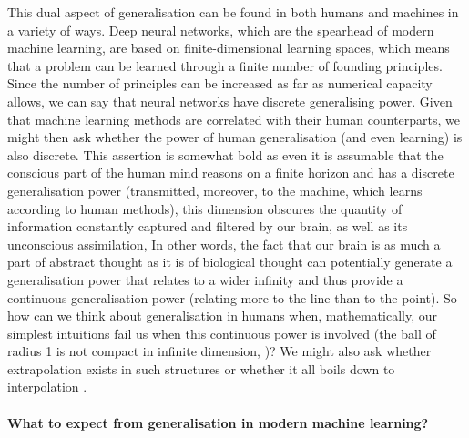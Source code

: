 This dual aspect of generalisation can be found in both humans and machines in a variety of ways. Deep neural networks, which are the spearhead of modern machine learning, are based on finite-dimensional learning spaces, which means that a problem can be learned through a finite number of founding principles. Since the number of principles can be increased as far as numerical capacity allows, we can say that neural networks have discrete generalising power. Given that machine learning methods are correlated with their human counterparts, we might then ask whether the power of human generalisation (and even learning) is also discrete. This assertion is somewhat bold as even it is assumable that the conscious part of the human mind reasons on a finite horizon and has a discrete generalisation power (transmitted, moreover, to the machine, which learns according to human methods), this dimension obscures the quantity of information constantly captured and filtered by our brain, as well as its unconscious assimilation, In other words, the fact that our brain is as much a part of abstract thought as it is of biological thought can potentially generate a generalisation power that relates to a wider infinity and thus provide a continuous generalisation power (relating more to the line than to the point). So how can we think about generalisation in humans when, mathematically, our simplest intuitions fail us when this continuous power is involved (the ball of radius 1 is not compact in infinite dimension, \citealp{riesz1955lecons})? We might also ask whether extrapolation exists in such structures or whether it all boils down to interpolation \citep{hasson2020direct}.

\paragraph{What to expect from generalisation in modern machine learning?}

